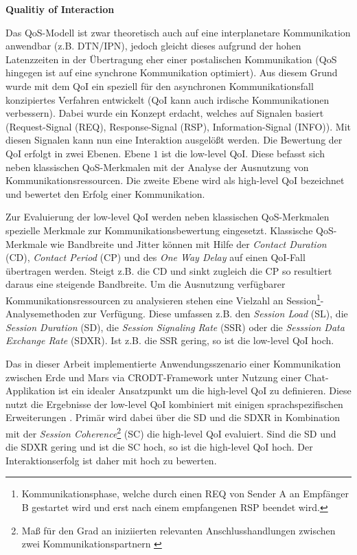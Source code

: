 \textbf{Qualitiy of Interaction} 

Das \gls{QoS}-Modell ist zwar theoretisch auch auf eine interplanetare Kommunikation
anwendbar (z.B. \gls{DTN}/\gls{IPN}), jedoch gleicht dieses aufgrund der hohen
Latenzzeiten in der {\"U}bertragung eher einer postalischen Kommunikation (\gls{QoS} hingegen
ist auf eine synchrone Kommunikation optimiert). Aus diesem Grund wurde mit dem
\gls{QoI} ein speziell f{\"u}r den asynchronen
Kommunikationsfall konzipiertes Verfahren entwickelt \cite{Daher2} (\gls{QoI}
kann auch irdische Kommunikationen verbessern). Dabei wurde ein Konzept erdacht,
welches auf Signalen basiert (Request-Signal (REQ), Response-Signal (RSP),
Information-Signal (INFO)). Mit diesen Signalen kann nun eine Interaktion
ausgel{\"o}{\ss}t werden. Die Bewertung der \gls{QoI} erfolgt in zwei Ebenen. Ebene $1$ ist die low-level \gls{QoI}. Diese befasst sich neben klassischen \gls{QoS}-Merkmalen mit der Analyse der Ausnutzung von
Kommunikationsressourcen. Die zweite Ebene wird als high-level \gls{QoI}
bezeichnet und bewertet den Erfolg einer Kommunikation.

Zur Evaluierung der low-level \gls{QoI} werden neben klassischen \gls{QoS}-Merkmalen
spezielle Merkmale zur Kommunikationsbewertung eingesetzt. Klassische
\gls{QoS}-Merkmale wie Bandbreite und Jitter k{\"o}nnen mit Hilfe der
\textit{Contact Duration} (CD), \textit{Contact Period} (CP) und des \textit{One
Way Delay} auf einen \gls{QoI}-Fall übertragen werden. Steigt z.B. die CD und
sinkt zugleich die CP so resultiert daraus eine steigende Bandbreite. Um die
Ausnutzung verf{\"u}gbarer Kommunikationsressourcen zu analysieren stehen eine
Vielzahl an Session\footnote{Kommunikationsphase, welche durch einen REQ von Sender A an
Empf{\"a}nger B gestartet wird und erst nach einem empfangenen RSP beendet
wird.}-Analysemethoden zur Verf{\"u}gung. Diese umfassen z.B. den
\textit{Session Load} (SL), die \textit{Session Duration} (SD), die
\textit{Session Signaling Rate} (SSR) oder die \textit{Sesssion Data Exchange Rate} (SDXR). Ist
z.B. die SSR gering, so ist die low-level \gls{QoI} hoch.

Das in dieser Arbeit implementierte Anwendungsszenario einer Kommunikation
zwischen Erde und Mars via \gls{CRODT}-Framework unter Nutzung einer
Chat-Applikation ist ein idealer Ansatzpunkt um die high-level \gls{QoI} zu
definieren. Diese nutzt die Ergebnisse der low-level \gls{QoI} kombiniert mit
einigen sprachspezifischen Erweiterungen \cite{Donick}. Prim{\"a}r wird dabei
{\"u}ber die SD und die SDXR in Kombination mit der \textit{Session
Coherence}\footnote{Ma{\ss} f{\"u}r den Grad an iniziierten relevanten
Anschlusshandlungen zwischen zwei Kommunikationspartnern \cite{Donick}} (SC) die
high-level \gls{QoI} evaluiert. Sind die SD und die SDXR gering und ist die SC hoch,
so ist die high-level \gls{QoI} hoch.
Der Interaktionserfolg ist daher mit hoch zu bewerten.

